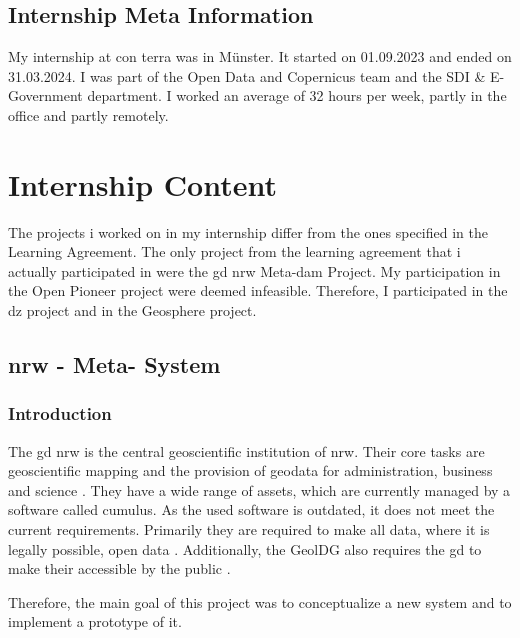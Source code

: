 \documentclass[11pt, titlepage, a4paper]{article}
\begin{document}
\subsection{Internship Meta Information}

My internship at con terra was in Münster. It started on 01.09.2023 and ended on 31.03.2024. I was part of the Open Data and Copernicus team and the SDI \& E-Government department. I worked an average of 32 hours per week, partly in the office and partly remotely.

\section{Internship Content}
The projects i worked on in my internship differ from the ones specified in the Learning Agreement. The only project from the learning agreement that i actually participated in were the \gls{gd} \gls{nrw} Meta-\gls{dam} Project. My participation in the Open Pioneer project were deemed infeasible. Therefore, I participated in the \gls {dz} project and in the Geosphere project. 

\subsection{ \gls{nrw} -  Meta- System }
\subsubsection{Introduction}
The  \gls {gd} \gls {nrw}  is the central geoscientific institution of \gls {nrw}. Their  core tasks are geoscientific mapping and the provision of geodata for administration, business and science \cite{GeoDatenFurNordrheinWestfalen2024}. 
They have a wide range of assets, which are currently managed by a software called cumulus. As the used software is outdated, it does not meet the current requirements.
Primarily they  are required to make all data, where it is legally possible, open data \cite{GesetzZurForderung2017}.
Additionally, the GeolDG also requires the \gls{gd} to make their accessible by the public \cite{GesetzZurStaatlichen2020}.

Therefore, the main goal of this project was to conceptualize a new system and to implement a prototype of it.
\end{document}

